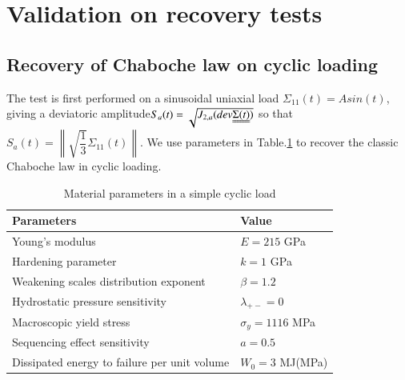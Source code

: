 \documentclass[3p,times,number,review]{elsarticle}
\begin{document}
\newpage
\section{Validation on recovery tests}
\label{sec:5.8}
\subsection{Recovery of Chaboche law on cyclic loading}
The test is first performed on a sinusoidal uniaxial load $\Sigma_{11}(t)=Asin(t)$, giving a deviatoric amplitude$S_{a}(t)=\sqrt{J_{2,a}(dev\uuline{\Sigma(t)})}$  so that $S_{a}(t)=\left\| \sqrt{\dfrac{1}{3}}\Sigma_{11}(t)\right\| $. We use parameters in Table.\ref{tab:Sin} to recover the classic Chaboche law in cyclic loading.
\begin{table}[!h]
\centering
\begin{tabular}{ll}
\hline
\textbf{Parameters}                                         & \textbf{Value}                    \\ \hline
Young's modulus                                             & $E=215$ GPa                       \\
Hardening parameter                                         &  $k=1$ GPa \\
Weakening scales distribution exponent                      & $\beta=1.2$                             \\
Hydrostatic pressure sensitivity                            & $\lambda_{+-}=0$                     \\
Macroscopic yield stress                                    & $\sigma_y=1116$ MPa              \\
Sequencing effect sensitivity                               & $a=0.5$                        \\
Dissipated energy to failure per unit volume                & $W_0=3$ MJ(MPa)                       \\ \hline
\end{tabular}
\caption{Material parameters in a simple cyclic load }
\label{tab:Sin}
\end{table}
\end{document}
